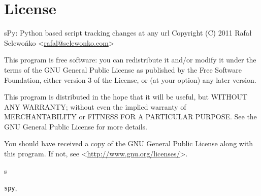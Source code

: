 \documentclass[letterpaper,10pt,english]{sphinxmanual}
\begin{document}
\chapter{License}
\label{index:license}
sPy: Python based script tracking changes at any url
Copyright (C) 2011  Rafał Selewońko \textless{}\href{mailto:rafal@selewonko.com}{rafal@selewonko.com}\textgreater{}

This program is free software: you can redistribute it and/or modify
it under the terms of the GNU General Public License as published by
the Free Software Foundation, either version 3 of the License, or
(at your option) any later version.

This program is distributed in the hope that it will be useful,
but WITHOUT ANY WARRANTY; without even the implied warranty of
MERCHANTABILITY or FITNESS FOR A PARTICULAR PURPOSE.  See the
GNU General Public License for more details.

You should have received a copy of the GNU General Public License
along with this program.  If not, see \textless{}\href{http://www.gnu.org/licenses/}{http://www.gnu.org/licenses/}\textgreater{}.


\renewcommand{\indexname}{Python Module Index}
\begin{theindex}
\def\bigletter#1{{\Large\sffamily#1}\nopagebreak\vspace{1mm}}
\bigletter{s}
\item {\texttt{spy}}, \pageref{index:module-spy}
\end{theindex}

\renewcommand{\indexname}{Index}
\printindex
\end{document}
